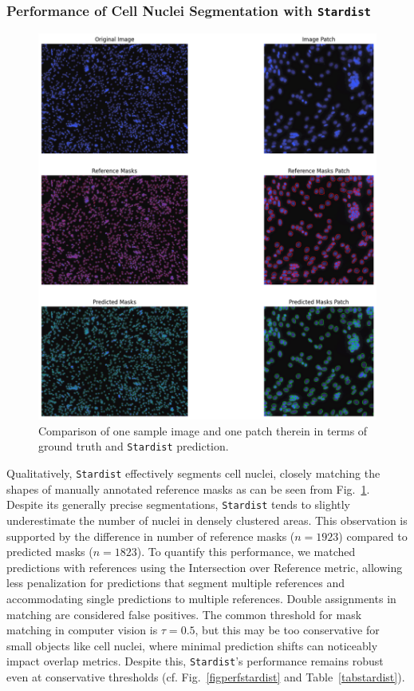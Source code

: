\subsubsection{Performance of Cell Nuclei Segmentation with \texttt{Stardist}}

\begin{figure}
	\centering
	\includegraphics[width=\textwidth]{"images/qualitative_performance_stardist.png"}
	\caption[Qualitative performance \texttt{Stardist}]{Comparison of one sample image and one patch therein in terms of ground truth and \texttt{Stardist} prediction.}
	\label{figperfstardistqual}
\end{figure} 

Qualitatively, \texttt{Stardist} effectively segments cell nuclei, closely matching the shapes of manually annotated reference masks as can be seen from Fig.~\ref{figperfstardistqual}. Despite its generally precise segmentations, \texttt{Stardist} tends to slightly underestimate the number of nuclei in densely clustered areas. This observation is supported by the difference in number of reference masks ($n=1923$) compared to predicted masks ($n=1823$). To quantify this performance, we matched predictions with references using the Intersection over Reference metric, allowing less penalization for predictions that segment multiple references and accommodating single predictions to multiple references. Double assignments in matching are considered false positives.
The common threshold for mask matching in computer vision is $\tau = 0.5$, but this may be too conservative for small objects like cell nuclei, where minimal prediction shifts can noticeably impact overlap metrics. Despite this, \texttt{Stardist}'s performance remains robust even at conservative thresholds (cf. Fig.~\ref{figperfstardist} and Table~\ref{tabstardist}).


